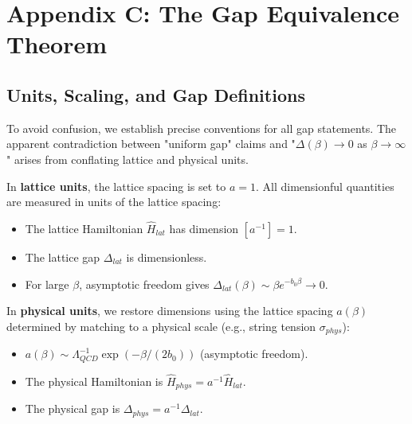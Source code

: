 \chapter{Appendix C: The Gap Equivalence Theorem}
\label{app:gap_equivalence}
\label{ch:gap_equivalence}

\section{Units, Scaling, and Gap Definitions}
\label{sec:gap_units}

\begin{remark}
To avoid confusion, we establish precise conventions for all gap statements. The apparent contradiction between "uniform gap" claims and "$\Delta(\beta) \to 0$ as $\beta \to \infty$" arises from conflating lattice and physical units.
\end{remark}

\begin{definition}
\label{def:lattice_units}
In \textbf{lattice units}, the lattice spacing is set to $a=1$. All dimensionful quantities are measured in units of the lattice spacing:
\begin{itemize}
    \item The lattice Hamiltonian $\hat{H}_{lat}$ has dimension $[a^{-1}] = 1$.
    \item The lattice gap $\Delta_{lat}$ is dimensionless.
    \item For large $\beta$, asymptotic freedom gives $\Delta_{lat}(\beta) \sim \beta e^{-b_0 \beta} \to 0$.
\end{itemize}
\end{definition}

\begin{definition}
\label{def:physical_units}
In \textbf{physical units}, we restore dimensions using the lattice spacing $a(\beta)$ determined by matching to a physical scale (e.g., string tension $\sigma_{phys}$):
\begin{itemize}
    \item $a(\beta) \sim \Lambda_{QCD}^{-1} \exp(-\beta/(2b_0))$ (asymptotic freedom).
    \item The physical Hamiltonian is $\hat{H}_{phys} = a^{-1} \hat{H}_{lat}$.
    \item The physical gap is $\Delta_{phys} = a^{-1} \Delta_{lat}$.
\end{itemize}
\end{definition}

